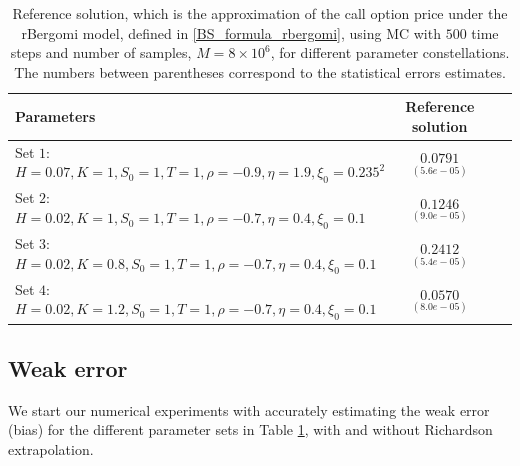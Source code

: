 \FloatBarrier
\begin{table}[!h]
	\centering
	\begin{small}
	\begin{tabular}{l*{2}{c}r}
	\toprule[1.5pt]
		Parameters            & Reference solution    \\
		\hline

			Set $1$:	$H=0.07, K=1,S_0=1, T=1, \rho=-0.9, \eta=1.9,\xi_0=0.235^2$   & $\underset{(5.6e-05)}{0.0791}$  \\	

				Set $2$:	$H=0.02, K=1, S_0=1, T=1,\rho=-0.7, \eta=0.4,\xi_0=0.1$   & $\underset{(9.0e-05)}{0.1246}$  \\
					Set $3$:	$H=0.02, K=0.8,S_0=1,T=1, \rho=-0.7, \eta=0.4,\xi_0=0.1$   & $\underset{(5.4e-05)}{0.2412}$  \\
						Set $4$:	$H=0.02, K=1.2,S_0=1,T=1, \rho=-0.7, \eta=0.4,\xi_0=0.1$   & $\underset{(8.0e-05)}{0.0570}$  \\
	\bottomrule[1.25pt]
	\end{tabular}
\end{small}
	\caption{Reference solution, which is the  approximation of the call option price under the rBergomi model, defined in \eqref{BS_formula_rbergomi},  using MC with $500$ time steps and number of samples, $M=8 \times 10^6$, for different parameter constellations.  The numbers between parentheses correspond to the statistical errors estimates.}
	\label{table:Reference solution, using MC with $500$ time steps, of Call option price under rBergomi model, for different parameter constellation.}
\end{table}
\FloatBarrier

\subsection{Weak error} \label{sec:Weak error plots_no_change}
We start our numerical experiments with accurately  estimating the weak error (bias)  for the different parameter sets  in Table \ref{table:Reference solution, using MC with $500$ time steps, of Call option price under rBergomi model, for different parameter constellation.}, with and without Richardson extrapolation.  

